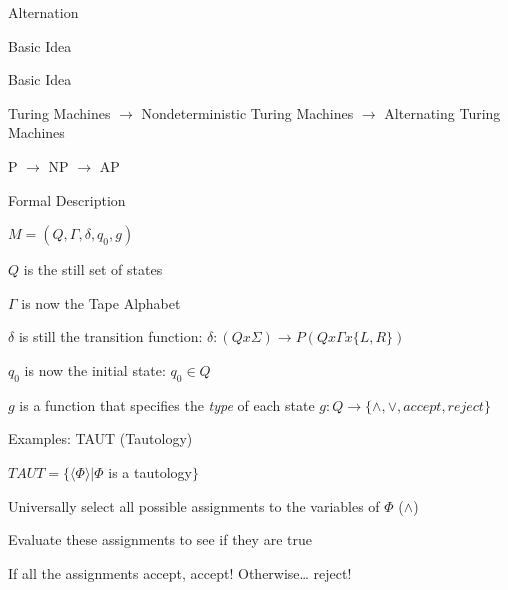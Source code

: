 \documentclass[presentation]{beamer}
\begin{document}
\begin{frame}[label={sec:orgf916c10}]{Alternation}
\begin{block}{Basic Idea}
\begin{center}
\end{center}
\end{block}
\begin{block}{Basic Idea}
\begin{block}{Turing Machines \(\rightarrow\) Nondeterministic Turing Machines \(\rightarrow\) Alternating Turing Machines}
\end{block}
\begin{block}{P \(\rightarrow\) NP \(\rightarrow\) AP}
\end{block}
\end{block}
\begin{block}{Formal Description}
\begin{block}{\(M = (Q,\Gamma,\delta,q_{0},g)\)}
\begin{block}{\(Q\) is the still set of states}
\end{block}
\begin{block}{\(\Gamma\) is now the Tape Alphabet}
\end{block}
\begin{block}{\(\delta\) is still the transition function: \(\delta : (Q x \Sigma) \rightarrow P(Q x \Gamma x \{L,R\})\)}
\end{block}
\begin{block}{\(q_{0}\) is now the initial state: \(q_{0} \in Q\)}
\end{block}
\begin{block}{\(g\) is a function that specifies the \emph{type} of each state \(g : Q \rightarrow \{\land,\lor,accept,reject\}\)}
\end{block}
\end{block}
\end{block}
\begin{block}{Examples: TAUT (Tautology)}
\begin{block}{\(TAUT = \{\langle \Phi \rangle | \Phi\) is a tautology\(\}\)}
\begin{block}{Universally select all possible assignments to the variables of \(\Phi\) (\(\land\))}
\end{block}
\begin{block}{Evaluate these assignments to see if they are true}
\end{block}
\begin{block}{If all the assignments accept, accept! Otherwise\ldots{} reject!}
\end{block}
\end{block}
\end{block}


\end{frame}
\end{document}
